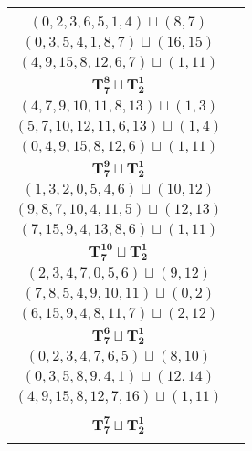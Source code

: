 \documentclass{article}
\begin{document}
\begin{longtable}{|c|c|}
\begin{tabular}{c}
        $(2,4,6,9,12,8,7)\sqcup(11,14)$ \\ 
        $(0,2,3,6,5,1,4)\sqcup(8,7)$ \\ 
        $(0,3,5,4,1,8,7)\sqcup(16,15)$ \\ 
        $(4,9,15,8,12,6,7)\sqcup(1,11)$
        \end{tabular} \\ 
        \hline
        $\mathbf{T_{7}^{8}} \sqcup \mathbf{T_{2}^{1}}$ & \begin{tabular}{c}
        $(1,2,4,6,8,5,9)\sqcup(12,15)$ \\ 
        $(4,7,9,10,11,8,13)\sqcup(1,3)$ \\ 
        $(5,7,10,12,11,6,13)\sqcup(1,4)$ \\ 
        $(0,4,9,15,8,12,6)\sqcup(1,11)$
        \end{tabular} \\ 
        \hline
        $\mathbf{T_{7}^{9}} \sqcup \mathbf{T_{2}^{1}}$ & \begin{tabular}{c}
        $(8,6,4,2,5,9,7)\sqcup(12,14)$ \\ 
        $(1,3,2,0,5,4,6)\sqcup(10,12)$ \\ 
        $(9,8,7,10,4,11,5)\sqcup(12,13)$ \\ 
        $(7,15,9,4,13,8,6)\sqcup(1,11)$
        \end{tabular} \\ 
        \hline
        $\mathbf{T_{7}^{10}} \sqcup \mathbf{T_{2}^{1}}$ & \begin{tabular}{c}
        $(7,6,4,2,8,9,5)\sqcup(12,14)$ \\ 
        $(2,3,4,7,0,5,6)\sqcup(9,12)$ \\ 
        $(7,8,5,4,9,10,11)\sqcup(0,2)$ \\ 
        $(6,15,9,4,8,11,7)\sqcup(2,12)$
        \end{tabular} \\ 
        \hline
        $\mathbf{T_{7}^{6}} \sqcup \mathbf{T_{2}^{1}}$ & \begin{tabular}{c}
        $(2,4,6,8,7,9,12)\sqcup(13,14)$ \\ 
        $(0,2,3,4,7,6,5)\sqcup(8,10)$ \\ 
        $(0,3,5,8,9,4,1)\sqcup(12,14)$ \\ 
        $(4,9,15,8,12,7,16)\sqcup(1,11)$
        \end{tabular} \\ 
        \hline
        $\mathbf{T_{7}^{7}} \sqcup \mathbf{T_{2}^{1}}$ & \begin{tabular}{c}

\end{tabular}
\end{longtable}
\end{document}
